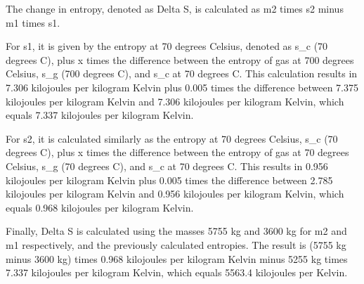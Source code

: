 The change in entropy, denoted as Delta S, is calculated as m2 times s2 minus m1 times s1.

For s1, it is given by the entropy at 70 degrees Celsius, denoted as s_c (70 degrees C), plus x times the difference between the entropy of gas at 700 degrees Celsius, s_g (700 degrees C), and s_c at 70 degrees C. This calculation results in 7.306 kilojoules per kilogram Kelvin plus 0.005 times the difference between 7.375 kilojoules per kilogram Kelvin and 7.306 kilojoules per kilogram Kelvin, which equals 7.337 kilojoules per kilogram Kelvin.

For s2, it is calculated similarly as the entropy at 70 degrees Celsius, s_c (70 degrees C), plus x times the difference between the entropy of gas at 70 degrees Celsius, s_g (70 degrees C), and s_c at 70 degrees C. This results in 0.956 kilojoules per kilogram Kelvin plus 0.005 times the difference between 2.785 kilojoules per kilogram Kelvin and 0.956 kilojoules per kilogram Kelvin, which equals 0.968 kilojoules per kilogram Kelvin.

Finally, Delta S is calculated using the masses 5755 kg and 3600 kg for m2 and m1 respectively, and the previously calculated entropies. The result is (5755 kg minus 3600 kg) times 0.968 kilojoules per kilogram Kelvin minus 5255 kg times 7.337 kilojoules per kilogram Kelvin, which equals 5563.4 kilojoules per Kelvin.